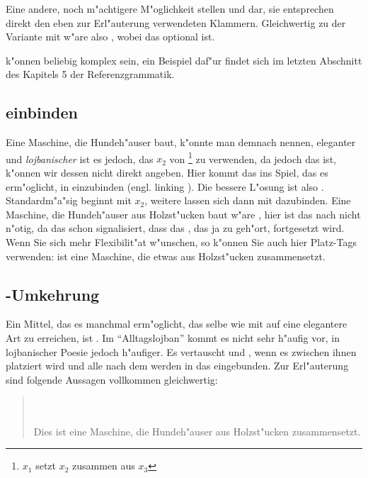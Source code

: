 Eine andere, noch m"achtigere M"oglichkeit stellen  und  dar, sie entsprechen direkt den eben zur Erl"auterung verwendeten
Klammern. Gleichwertig zu der Variante mit  w"are also , wobei das  optional ist.

 k"onnen beliebig komplex sein, ein Beispiel daf"ur findet sich im letzten Abschnitt des Kapitels 5 der Referenzgrammatik.

\subsection{ einbinden}
Eine Maschine, die Hundeh"auser baut, k"onnte man demnach  nennen, eleganter und \emph{lojbanischer} ist es jedoch,
 das $x_2$ von \footnote{$x_1$ setzt $x_2$ zusammen aus $x_3$} zu verwenden, da  jedoch das  ist, k"onnen
wir dessen  nicht direkt angeben. Hier kommt das   ins Spiel, das es erm"oglicht,  in 
einzubinden (engl. linking ).
Die bessere L"osung ist also . Standardm"a"sig beginnt  mit $x_2$, weitere  lassen
sich dann mit  dazubinden. Eine Maschine, die Hundeh"auser aus Holzst"ucken baut w"are , hier ist das  nach  nicht n"otig, da das  schon signalisiert, dass das , das ja zu  geh"ort, fortgesetzt wird.
Wenn Sie sich mehr Flexibilit"at w"unschen, so k"onnen Sie auch hier Platz-Tags verwenden:  ist eine
Maschine, die etwas aus Holzst"ucken zusammensetzt.

\subsection{-Umkehrung}
Ein Mittel, das es manchmal erm"oglicht, das selbe wie mit  auf eine elegantere Art zu erreichen, ist . Im ``Alltagslojban''
kommt es nicht sehr h"aufig vor, in lojbanischer Poesie jedoch h"aufiger.
Es vertauscht  und , wenn es zwischen ihnen platziert wird und alle  nach dem  werden in das
 eingebunden. Zur Erl"auterung sind folgende Aussagen vollkommen gleichwertig:
\begin{quote}
 \\
 \\
Dies ist eine Maschine, die Hundeh"auser aus Holzst"ucken zusammensetzt.
\end{quote}

